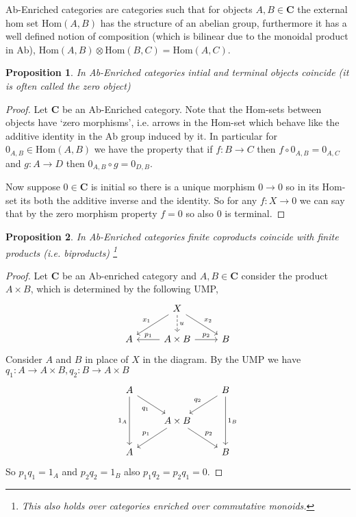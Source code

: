 \documentclass[12pt]{article}
\numberwithin{equation}{section}
\newcommand{\Hom}{{\mathrm{Hom}}}
\newtheorem{proposition}{Proposition}[section]
\begin{document}
\begin{appendices}
	Ab-Enriched categories are categories such that for objects $A,B \in \mathbf{C}$ the external hom set $\Hom(A,B)$ has the structure of an abelian group, furthermore it has a well defined notion of composition (which is bilinear due to the monoidal product in Ab), $\Hom(A,B)\otimes \Hom(B,C) =\Hom(A,C)$. 
	\begin{proposition}
		In Ab-Enriched categories intial and terminal objects coincide (it is often called the zero object)
	\end{proposition}
	\begin{proof}
		Let $\mathbf{C}$ be an Ab-Enriched category. Note that the Hom-sets between objects have `zero morphisms', i.e. arrows in the Hom-set which behave like the additive identity in the Ab group induced by it. In particular for $0_{A,B}\in \Hom(A,B)$ we have the property that if $f:B \to C$ then $f\circ 0_{A,B}=0_{A,C}$ and $g: A \to D$ then $0_{A,B}\circ g=0_{D,B}$.
		
		Now suppose $0 \in \mathbf{C}$ is initial so there is a unique morphism $0\to 0$ so in its Hom-set its both the additive inverse and the identity. So for any $f:X \to 0$ we can say that by the zero morphism property $f=0$ so also $0$ is terminal.
	\end{proof}
	\begin{proposition}
		In Ab-Enriched categories finite coproducts coincide with finite products (i.e. biproducts) \footnote{This also holds over categories enriched over commutative monoids.}
	\end{proposition}
	\begin{proof}	
		Let $\mathbf{C}$ be an Ab-enriched category and $A,B\in \mathbf{C}$ consider the product $A\times B$, which is determined by the following UMP,
		\[\begin{tikzcd}
			& X \\
			A & A\times B & B
			\arrow["{p_1}"', from=2-2, to=2-1]
			\arrow["{p_2}", from=2-2, to=2-3]
			\arrow["u", dashed, from=1-2, to=2-2]
			\arrow["{x_1}"', from=1-2, to=2-1]
			\arrow["{x_2}", from=1-2, to=2-3]
		\end{tikzcd}\]
		Consider $A$ and $B$ in place of $X $ in the diagram. By the UMP we have $q_1: A \to A\times B, q_2: B \to A\times B$
		\[\begin{tikzcd}
			A && B \\
			& {A\times B} \\
			A && B
			\arrow["{p_1}"', from=2-2, to=3-1]
			\arrow["{p_2}", from=2-2, to=3-3]
			\arrow["{q_2}"', from=1-3, to=2-2]
			\arrow["{q_1}"', from=1-1, to=2-2]
			\arrow["{1_A}"', from=1-1, to=3-1]
			\arrow["{1_B}", from=1-3, to=3-3]
		\end{tikzcd}\]
		So $p_1q_1=1_A$ and $p_2q_2=1_B$ also $p_1q_2=p_2q_1=0$.
		

\end{proof}
\end{appendices}
\end{document}
